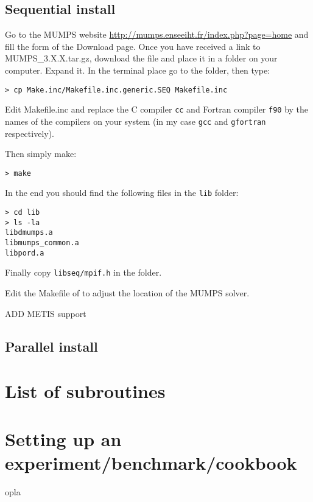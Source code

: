 \subsection{Sequential install}

Go to the MUMPS website \url{http://mumps.enseeiht.fr/index.php?page=home} and 
fill the form of the Download page. 
Once you have received a link to {\filenamefont MUMPS\_3.X.X.tar.gz}, download
the file and place it in a folder on your computer. Expand it. 
In the terminal place go to the folder, then type:
\begin{verbatim}
> cp Make.inc/Makefile.inc.generic.SEQ Makefile.inc
\end{verbatim}
Edit {\filenamefont Makefile.inc} and replace the C compiler {\tt cc} 
and Fortran compiler {\tt f90} by the names of the compilers on 
your system (in my case {\tt gcc} and {\tt gfortran} respectively).

Then simply make:
\begin{verbatim}
> make 
\end{verbatim}
In the end you should find the following files in the {\tt lib} folder:
\begin{verbatim}
> cd lib
> ls -la
libdmumps.a
libmumps_common.a
libpord.a
\end{verbatim}
Finally copy {\tt libseq/mpif.h} in the \elefant folder.

Edit the Makefile of \elefant to adjust the location of the MUMPS solver.

ADD METIS support

\subsection{Parallel install}


\section{List of subroutines}



\section{Setting up an experiment/benchmark/cookbook}

opla

\begin{center}

\end{center}

